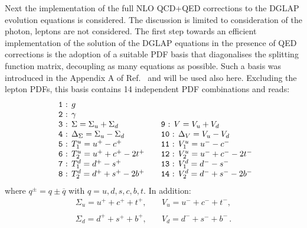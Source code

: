 Next the implementation of the full NLO QCD+QED corrections to the
DGLAP evolution equations is considered.
%
The discussion is limited to consideration of
the photon, leptons are not considered.
%
The first step towards an efficient implementation of the solution of
the DGLAP equations in the presence of QED corrections is the adoption
of a suitable PDF basis that diagonalises the splitting function
matrix, decoupling as many equations as possible.
%
Such a basis was introduced in the Appendix A of
Ref.~\cite{Bertone:2015lqa} and will be used also here.
%
Excluding the lepton PDFs, this basis contains 14 independent PDF
combinations and reads:
\begin{equation}\label{eq:EvolBasis}
\begin{array}{ll}
\mbox{\texttt{ 1} : }g & \\
\mbox{\texttt{ 2} : }\gamma & \\
\mbox{\texttt{ 3} : }\displaystyle \Sigma = \Sigma_u + \Sigma_d & \quad
\mbox{\texttt{9} : }\displaystyle V =V_u +  V_d\\
\mbox{\texttt{ 4} : } \displaystyle \Delta_\Sigma = \Sigma_u - \Sigma_d& \quad\displaystyle 
\mbox{\texttt{10} : } \Delta_V = V_u - V_d\\
\mbox{\texttt{ 5} : }T_1^u = u^+ - c^+ &\quad \mbox{\texttt{11} : }V_1^u = u^- - c^- \\
\mbox{\texttt{ 6} : }T_2^u = u^+ + c^+ - 2t^+ &\quad \mbox{\texttt{12} : }V_2^u = u^- + c^- - 2t^-\\
\mbox{\texttt{ 7} : }T_1^d = d^+ - s^+ &\quad \mbox{\texttt{13} : }V_1^d = d^- - s^- \\
\mbox{\texttt{ 8} : }T_2^d = d^+ + s^+ - 2b^+ &\quad \mbox{\texttt{14}
                                               : }V_2^d = d^- + s^- -
                                               2b^-\\
\end{array}
\end{equation}
where $q^\pm = q\pm\overline{q}$ with
$q = u,d,s,c,b,t$. In addition:
\begin{equation}
\begin{array}{ll}
\Sigma_u = u^++c^++t^+, &\quad V_u = u^-+c^-+t^-,\\
\\
\Sigma_d = d^++s^++b^+,&\quad V_d = d^-+s^-+b^-\,.
\end{array}
\end{equation}


